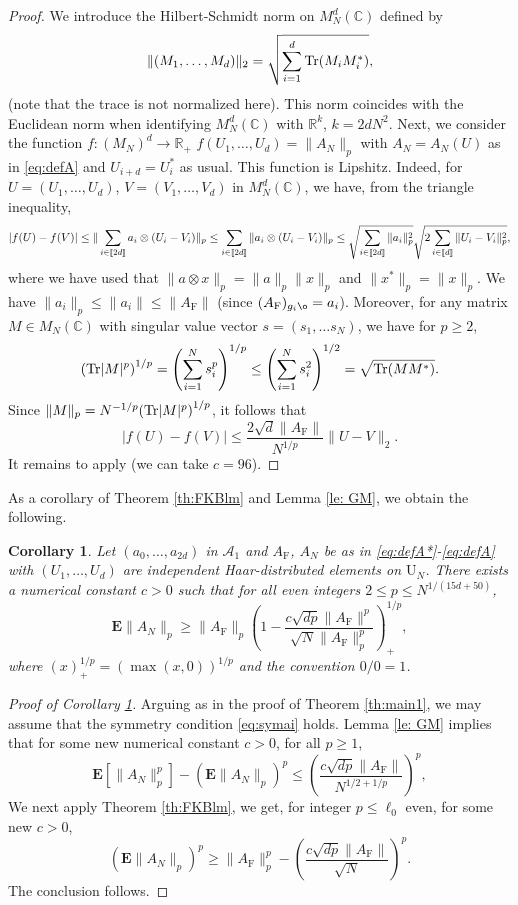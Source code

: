 \documentclass[11pt]{article}
\renewcommand{\star}{{\mathrm{F}}}
\newtheorem{corollary}[lemma]{Corollary}
\newcommand{\cA}{\mathcal{A}}
\newcommand{\Tr}{{\rm Tr}}
\newcommand{\dE}{\mathbf {E}}
\newcommand{\dU}{\mathrm {U}}
\newcommand{\dR}{\mathbb {R}}
\newcommand{\dC}{\mathbb {C}}
\newcommand{\PAR}[1]{{{\left(#1\right)}}} %
\newcommand{\1}{1\!\!{\sf I}}
\newcommand{\INT}[1]{{{\left[\hspace{-1.4pt}\left[#1\right]\hspace{-1.4pt}\right]}}}
\begin{document}
\begin{proof}
 We introduce the Hilbert-Schmidt norm on $M_N^d(\dC)$ defined by
$$
\| (M_1,\ldots,M_d) \|_{2} = \sqrt{ \sum_{i=1}^d \Tr (M_i M_i^*)  },
$$
(note that the trace is not normalized here). This norm coincides with the Euclidean norm when identifying $M^d_N(\dC)$ with $\dR^k$, $k = 2dN^2$. Next, we consider the function  $f : (M_N)^d \to \dR_+$ $f(U_1,\ldots,U_d) = \| A_N \|_p$ with $A_N = A_N(U)$ as in \eqref{eq:defA} and $U_{i+d} = U_i^*$ as usual. This function is Lipshitz. Indeed, for $U= (U_1,\ldots,U_d)$, $V = (V_1,\ldots,V_d)$ in $M_N^d(\dC)$, we have, from the triangle inequality,
$$
| f (U ) -f (V) | \leq \| \sum_{i\in \INT{2d}} a_i \otimes (U_i-V_i ) \|_p \leq  \sum_{i\in \INT{2d}} \| a_i \otimes (U_i-V_i ) \|_p \leq \sqrt{ \sum_{i \in \INT{2d}} \|a_i\|_p^2 } \sqrt { 2\sum_{i \in \INT{d}}  \| U_i-V_i \|^2_p}, 
$$
where we have used that $\| a \otimes x \|_p =\| a \|_p\|x \|_p $ and $\| x^* \|_p = \| x\|_p$. We have $\| a_i\|_p \leq \|a_i \| \leq \| A_\star\| $ (since $(A_\star)_{g_i \o} = a_i$). Moreover, for any matrix $M \in M_N(\dC)$ with singular value vector $s = ( s_1,\ldots s_N)$, we have for $p \geq 2$,
$$
\PAR{\Tr  | M |^p }^{1/p} = \PAR{ \sum_{i=1}^N s_i^p }^{1/p} \leq  \PAR{ \sum_{i=1}^N s_i^2 }^{1/2} = \sqrt{ \Tr (M M^*) }. 
$$
Since $\| M \|_p = N^{-1/p} \PAR{\Tr | M |^p }^{1/p}$, it follows that 
$$
| f (U ) -f (V) | \leq  \frac{2 \sqrt d \| A_\star\| }{ N^{1/p} } \| U - V \|_2.
$$
It remains to apply \cite[Theorem 5.17]{MR3971582} (we can take $c = 96$).
\end{proof}

As a corollary of Theorem \ref{th:FKBlm} and Lemma \ref{le: GM}, we obtain the following. 

\begin{corollary}\label{cor:LBU1}
Let $(a_0,\ldots,a_{2d})$ in $\cA_1$ and $A_\star$, $A_N$ be as in \eqref{eq:defA*}-\eqref{eq:defA} with  $(U_1,\ldots, U_d)$ are independent Haar-distributed elements on $\dU_N$. There exists a numerical constant $c >0$ such that for all even integers $2 \leq p \leq N^{1/(15d + 50)}$, 
$$
\dE \| A_N \|_p \geq \|A_\star\|_p  \PAR{ 1 -   \frac{c \sqrt{d p } \| A _\star \|^p }{\sqrt N \|A_\star\|_p ^p} }_+^{1/p} ,
$$
where $(x)^{1/p}_+ = (\max(x,0))^{1/p}$ and the convention $0/0 =1$.
\end{corollary}

\begin{proof}[Proof of Corollary \ref{cor:LBU1}]
Arguing as in the proof of Theorem \ref{th:main1}, we may assume that the symmetry condition \eqref{eq:symai} holds. Lemma \ref{le: GM} implies that for some new numerical constant $c >0$, for all $p \geq 1$, 
\begin{equation}\label{eq:eop}
\dE [ \| A_N \|^p_p ] - (\dE \| A_N \|_p  )^p \leq  \PAR{ \frac{c \sqrt{d p } \| A _\star \|}{N^{1/2+ 1/p}} }^p,
\end{equation}
We next apply Theorem \ref{th:FKBlm}, we get, for integer $p \leq \ell_0$ even, for some new $c >0$,
$$
(\dE \| A_N \|_p  )^p \geq \|A_\star\|_p ^p  - \PAR{ \frac{c \sqrt{d p } \| A _\star \|}{\sqrt N } }^p.
$$
The conclusion follows.  
\end{proof}
\end{document}

